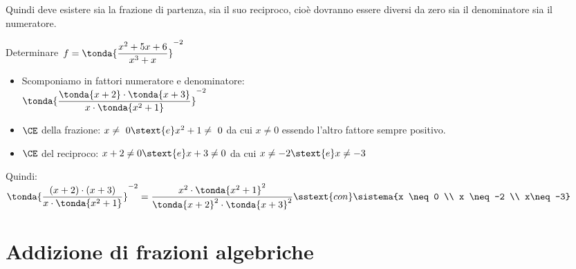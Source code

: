Quindi deve esistere sia la frazione di partenza, sia il suo reciproco, 
cioè dovranno essere diversi da zero sia il denominatore sia il 
numeratore.

\begin{esempio}{}{}
Determinare~\(f = \tonda{\dfrac{x^{2}+5x+6}{x^{3}+x}} ^{-2}\)
\begin{itemize}[nosep]
\item Scomponiamo in fattori numeratore e denominatore: \\
\( \tonda{\dfrac{ \tonda{x+2} \cdot  \tonda{x+3} }
                          {x\cdot  \tonda{x^{2}+1} }} ^{-2}\)
\item \(\CE\) della frazione: \(x\neq~0 \stext{e} x^2+1\neq~0\) da cui
\(x \neq 0\) essendo l'altro fattore sempre positivo.
\item \(\CE\) del reciproco: \(x+2 \neq 0 \stext{e} x+3 \neq 0\) da cui 
\(x \neq -2 \stext{e} x \neq -3\)
\end{itemize}
Quindi:
\(\tonda{\dfrac{(x+2)\cdot (x+3)}{x\cdot  \tonda{x^2+1} }}^{-2}=
\dfrac{x^2 \cdot \tonda{x^2+1}^2}{\tonda{x+2}^{2} \cdot \tonda{x+3}^2}
\sstext{con} \sistema{x \neq 0 \\ x \neq -2 \\ x\neq-3}\)
\end{esempio}


\section{Addizione di frazioni algebriche}
\label{sec:frazalg_addizione}


